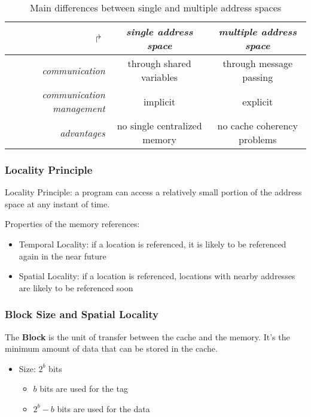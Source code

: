 \documentclass[english]{article}
\begin{document}
\begin{table}[htbp]
  \begin{tabular}{r|c|c}
    \(\Rsh\)                          & \textit{single address space} & \textit{multiple address space} \\ \hline
    \textit{communication}            & through shared variables      & through message passing         \\
    \textit{communication management} & implicit                      & explicit                        \\
    \textit{advantages}               & no single centralized memory  & no cache coherency problems
  \end{tabular}

  \caption{Main differences between single and multiple address spaces}
  \label{tab:address-spaces-differences}
\end{table}

\subsubsection{Locality Principle}

Locality Principle: a program can access a relatively small portion of the address space at any instant of time.

Properties of the memory references:

\begin{itemize}
  \item Temporal Locality: if a location is referenced, it is likely to be referenced again in the near future
  \item Spatial Locality: if a location is referenced, locations with nearby addresses are likely to be referenced soon
\end{itemize}

\subsubsection{Block Size and Spatial Locality}

The \textbf{Block} is the unit of transfer between the cache and the memory.
It's the minimum amount of data that can be stored in the cache.

\begin{itemize}
  \item Size: \(2^b\) bits
        \begin{itemize}
          \item \(b\) bits are used for the tag
          \item \(2^b - b\) bits are used for the data
        \end{itemize}
\end{itemize}
\end{document}
